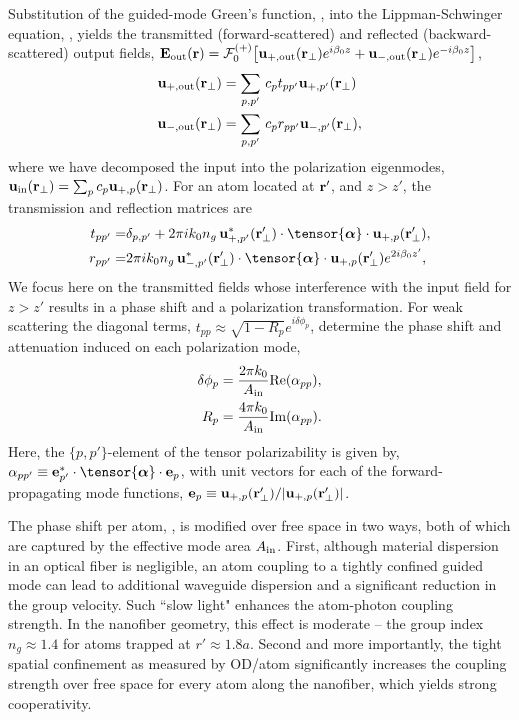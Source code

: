 \documentclass[preprint, aps,pra,onecolumn]{revtex4-1} %
\newcommand{\out}{{\rm out}}
\newcommand{\fwd}{+}
\newcommand{\bwd}{-}
\newcommand{\trans}{+}
\newcommand{\refl}{-}
\newcommand{\Eamp}{\mathcal{F}_0^{(+)}}
\begin{document}
Substitution of the guided-mode Green's function, , into the Lippman-Schwinger equation, , yields the transmitted (forward-scattered) and reflected (backward-scattered) output fields, $\mathbf{E}_{\out}(\br) = \Eamp \big[ \mathbf{u}_{\trans, \out} (\br_\perp) e^{i \beta_0 z} + \mathbf{u}_{\refl,\out} (\br_\perp) e^{-i \beta_0 z} \big]$, 
	\begin{align}
		\mathbf{u}_{\trans, \out} (\br_\perp) &=  \sum_{p,p'}  \, c_{p} t_{pp'} \mathbf{u}_{\fwd, p'}(\br_\perp) \\ 
		\mathbf{u}_{\refl,\out} (\br_\perp) &=  \sum_{p,p'}  \, c_{p} r_{pp'} \mathbf{u}_{\bwd, p'}(\br_\perp),
	\end{align}
where we have decomposed the input into the polarization eigenmodes, $\mbf{u}_{\rm in}(\mbf{r}_\perp) = \sum_{p} c_{p} \mathbf{u}_{\fwd,p}(\br_\perp)$.  
For an atom located at $\mathbf{r}'$, and $z>z'$, the transmission and reflection matrices are 
	\begin{align} \label{Eq::PolarizationTransformation}
		t_{pp'} =& \delta_{p,p'} +  2\pi i k_0 n_g \, \mathbf{u}^*_{+, p'}(\br'_\perp) \cdot 
\tensor{\boldsymbol{\alpha}} \cdot \mathbf{u}_{+, p}(\br'_\perp) , \\
		r_{pp'} =&  2\pi i k_0 n_g \, \mathbf{u}^*_{\bwd, p'}(\br'_\perp) \cdot 
\tensor{\boldsymbol{\alpha}} \cdot \mathbf{u}_{\fwd, p}(\br'_\perp) e^{2 i\beta_0 z'} , 
	\end{align} 
We focus here on the transmitted fields whose interference with the input field for $z>z'$ results in a phase shift and a polarization transformation.  
For weak scattering the diagonal terms, $t_{p p} \approx \sqrt{1-R_p}e^{i \delta \phi_p}$, determine the phase shift and attenuation induced on each polarization mode,
	\begin{align}
		 \delta \phi_p &= \frac{2 \pi k_0}{A_{\rm in}} {\rm Re}(\alpha_{pp}),  \label{Eq::PhaseShift} \\
		R_p &=  \frac{4 \pi k_0}{A_{\rm in}} {\rm Im}(\alpha_{pp}) .\label{Eq::Attenuation} 
	\end{align} 
Here, the $\{p,p'\}$-element of the tensor polarizability is given by, $\alpha_{pp'} \equiv \mathbf{e}^*_{p'} \cdot \tensor{\boldsymbol{\alpha}}\cdot \mathbf{e}_{p}$, with unit vectors for each of the forward-propagating mode functions, $\mathbf{e}_{p}\equiv \mathbf{u}_{+,p}(\mathbf{r}'_\perp)/|\mathbf{u}_{+,p}(\mathbf{r}'_\perp)|$. 

The phase shift per atom, , is modified over free space in two ways, both of which are captured by the effective mode area $A_{\rm in}$. 
First, although material dispersion in an optical fiber is negligible, an atom coupling to a tightly confined guided mode can lead to additional waveguide dispersion and a significant reduction in the group velocity.  
Such ``slow light" enhances the atom-photon coupling strength. 
In the nanofiber geometry, this effect is moderate -- the group index $n_g \approx 1.4$ for atoms trapped at $r' \approx1.8 a$. 
Second and more importantly, the tight spatial confinement as measured by OD/atom significantly increases the coupling strength over free space for every atom along the nanofiber, which yields strong cooperativity.
\end{document}

